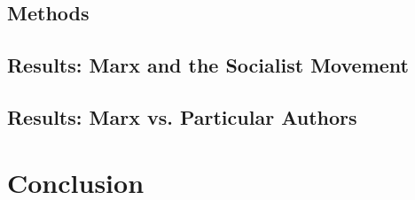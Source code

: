\subsection{Methods}



\subsection{Results: Marx and the Socialist Movement}



\subsection{Results: Marx vs. Particular Authors\label{sec:marxvauthors}}




\section{Conclusion\label{sec:conclusion}}





%
%




